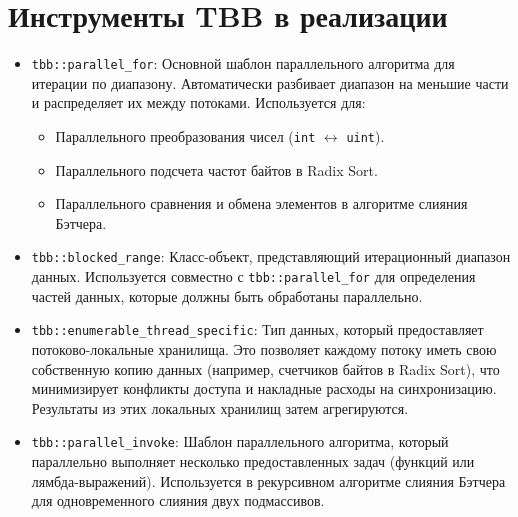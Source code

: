 \documentclass[12pt,a4paper]{extarticle}
\begin{document}
\section*{Инструменты TBB в реализации}
\begin{itemize}
    \item \texttt{tbb::parallel\_for}:
        Основной шаблон параллельного алгоритма для итерации по диапазону. Автоматически разбивает диапазон на меньшие части и распределяет их между потоками. Используется для:
        \begin{itemize}
            \item Параллельного преобразования чисел (\texttt{int} $\leftrightarrow$ \texttt{uint}).
            \item Параллельного подсчета частот байтов в Radix Sort.
            \item Параллельного сравнения и обмена элементов в алгоритме слияния Бэтчера.
        \end{itemize}
        
    \item \texttt{tbb::blocked\_range}:
        Класс-объект, представляющий итерационный диапазон данных. Используется совместно с \texttt{tbb::parallel\_for} для определения частей данных, которые должны быть обработаны параллельно.
        
    \item \texttt{tbb::enumerable\_thread\_specific}:
        Тип данных, который предоставляет потоково-локальные хранилища. Это позволяет каждому потоку иметь свою собственную копию данных (например, счетчиков байтов в Radix Sort), что минимизирует конфликты доступа и накладные расходы на синхронизацию. Результаты из этих локальных хранилищ затем агрегируются.
        
    \item \texttt{tbb::parallel\_invoke}:
        Шаблон параллельного алгоритма, который параллельно выполняет несколько предоставленных задач (функций или лямбда-выражений). Используется в рекурсивном алгоритме слияния Бэтчера для одновременного слияния двух подмассивов.
\end{itemize}
\end{document}
